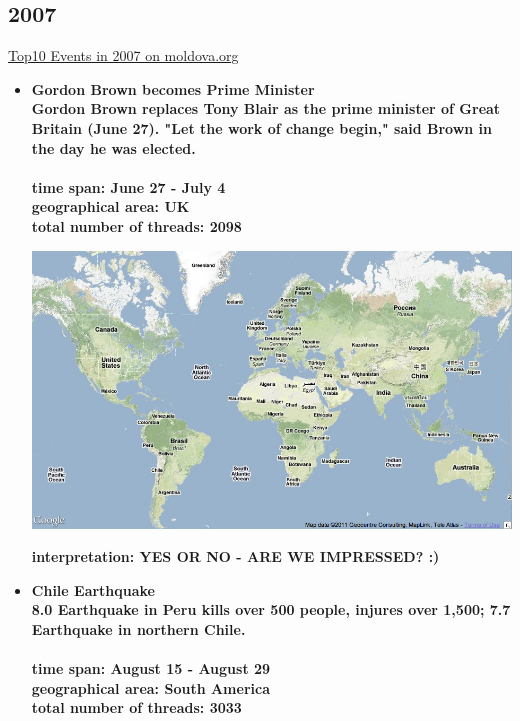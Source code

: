 \documentclass[11pt,a4paper,english]{article}
\begin{document}
			\subsection{2007}
			\href{http://social.moldova.org/news/10-most-important-world-events-of-2007-217388-eng.html}{Top10 Events in 2007 on moldova.org}
				\begin{itemize}
					\item \bf Gordon Brown becomes Prime Minister \rm
						\\ Gordon Brown replaces Tony Blair as the prime minister of Great Britain (June 27). "Let the work of change begin," said Brown in the day he was elected.
						\\\\ \bf time span: \rm June 27 - July 4
						\\ \bf geographical area: \rm UK
						\\ \bf total number of threads: \rm 2098
					
						\includegraphics[width=130mm]{img/2005-1}
						
						\bf interpretation: \rm YES OR NO - ARE WE IMPRESSED? :)
						
						
						
					\item \bf Chile Earthquake \rm
						\\ 8.0 Earthquake in Peru kills over 500 people, injures over 1,500; 7.7 Earthquake in northern Chile.
						\\\\ \bf time span: \rm August 15 - August 29
						\\ \bf geographical area: \rm South America
						\\ \bf total number of threads: \rm 3033
					

\end{itemize}
\end{document}
